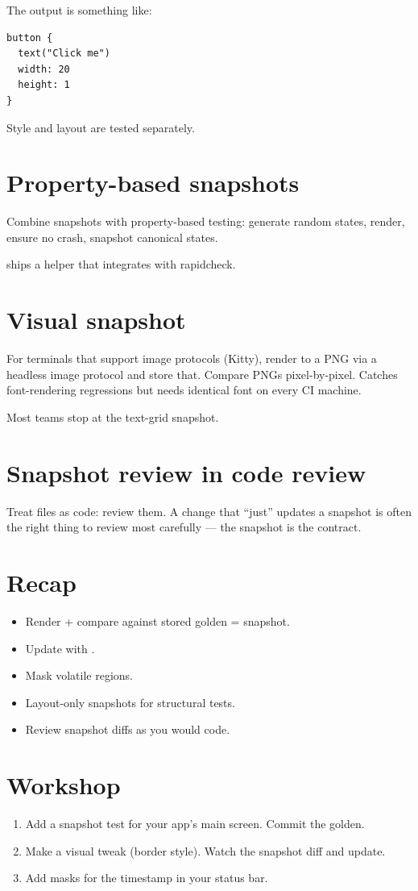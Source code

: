 The output is something like:

\begin{lstlisting}
button {
  text("Click me")
  width: 20
  height: 1
}
\end{lstlisting}

Style and layout are tested separately.

\section{Property-based snapshots}

Combine snapshots with property-based testing: generate
random states, render, ensure no crash, snapshot canonical
states.

\maya{} ships a  helper that integrates
with rapidcheck.

\section{Visual snapshot}

For terminals that support image protocols (Kitty), render to
a PNG via a headless image protocol and store that. Compare
PNGs pixel-by-pixel. Catches font-rendering regressions but
needs identical font on every CI machine.

Most teams stop at the text-grid snapshot.

\section{Snapshot review in code review}

Treat  files as code: review them. A change that
``just'' updates a snapshot is often the right thing to
review most carefully --- the snapshot is the contract.

\section{Recap}

\begin{recap}
\begin{itemize}[leftmargin=*]
  \item Render + compare against stored golden = snapshot.
  \item Update with .
  \item Mask volatile regions.
  \item Layout-only snapshots for structural tests.
  \item Review snapshot diffs as you would code.
\end{itemize}
\end{recap}

\section*{Workshop}

\begin{enumerate}[leftmargin=*]
  \item Add a snapshot test for your app's main screen.
    Commit the golden.
  \item Make a visual tweak (border style). Watch the
    snapshot diff and update.
  \item Add masks for the timestamp in your status bar.
\end{enumerate}
